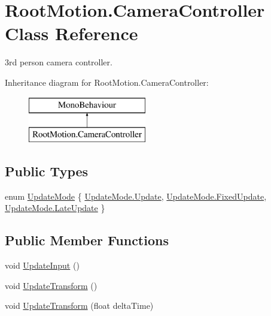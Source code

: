 \hypertarget{class_root_motion_1_1_camera_controller}{}\section{Root\+Motion.\+Camera\+Controller Class Reference}
\label{class_root_motion_1_1_camera_controller}


3rd person camera controller.  


Inheritance diagram for Root\+Motion.\+Camera\+Controller\+:\begin{figure}[H]
\begin{center}
\leavevmode
\includegraphics[height=2.000000cm]{class_root_motion_1_1_camera_controller}
\end{center}
\end{figure}
\subsection*{Public Types}
\begin{DoxyCompactItemize}
\item 
enum \mbox{\hyperlink{class_root_motion_1_1_camera_controller_ae662cdbe3ccf669cdb38fad428386edb}{Update\+Mode}} \{ \mbox{\hyperlink{class_root_motion_1_1_camera_controller_ae662cdbe3ccf669cdb38fad428386edba06933067aafd48425d67bcb01bba5cb6}{Update\+Mode.\+Update}}, 
\mbox{\hyperlink{class_root_motion_1_1_camera_controller_ae662cdbe3ccf669cdb38fad428386edba9c1ca4069e206318b33ef896d3dd204e}{Update\+Mode.\+Fixed\+Update}}, 
\mbox{\hyperlink{class_root_motion_1_1_camera_controller_ae662cdbe3ccf669cdb38fad428386edba2609005edfde618c70f2140bb3e9b7c2}{Update\+Mode.\+Late\+Update}}
 \}
\end{DoxyCompactItemize}
\subsection*{Public Member Functions}
\begin{DoxyCompactItemize}
\item 
void \mbox{\hyperlink{class_root_motion_1_1_camera_controller_a95cf187ed07b1ccbd21d3a17b3f63ed0}{Update\+Input}} ()
\item 
void \mbox{\hyperlink{class_root_motion_1_1_camera_controller_af74c8f1c2516f4c96b3656ba6652b04e}{Update\+Transform}} ()
\item 
void \mbox{\hyperlink{class_root_motion_1_1_camera_controller_a850110738716494db56b7e0e2e8e5a3a}{Update\+Transform}} (float delta\+Time)
\end{DoxyCompactItemize}
